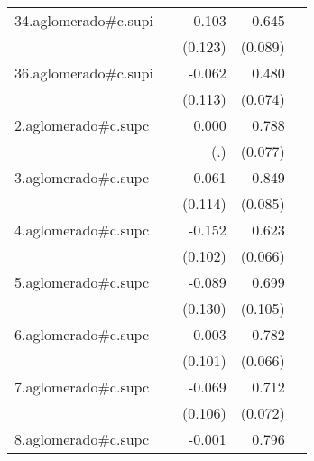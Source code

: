 {\begin{longtable}{l*{4}{D{.}{.}{-1}}}
\addlinespace
34.aglomerado#c.supi&                     &       0.103         &       0.645\sym{***}&                     \\
            &                     &     (0.123)         &     (0.089)         &                     \\
\addlinespace
36.aglomerado#c.supi&                     &      -0.062         &       0.480\sym{***}&                     \\
            &                     &     (0.113)         &     (0.074)         &                     \\
\addlinespace
2.aglomerado#c.supc&                     &       0.000         &       0.788\sym{***}&                     \\
            &                     &         (.)         &     (0.077)         &                     \\
\addlinespace
3.aglomerado#c.supc&                     &       0.061         &       0.849\sym{***}&                     \\
            &                     &     (0.114)         &     (0.085)         &                     \\
\addlinespace
4.aglomerado#c.supc&                     &      -0.152         &       0.623\sym{***}&                     \\
            &                     &     (0.102)         &     (0.066)         &                     \\
\addlinespace
5.aglomerado#c.supc&                     &      -0.089         &       0.699\sym{***}&                     \\
            &                     &     (0.130)         &     (0.105)         &                     \\
\addlinespace
6.aglomerado#c.supc&                     &      -0.003         &       0.782\sym{***}&                     \\
            &                     &     (0.101)         &     (0.066)         &                     \\
\addlinespace
7.aglomerado#c.supc&                     &      -0.069         &       0.712\sym{***}&                     \\
            &                     &     (0.106)         &     (0.072)         &                     \\
\addlinespace
8.aglomerado#c.supc&                     &      -0.001         &       0.796\sym{***}&                     \\

\end{longtable}}
